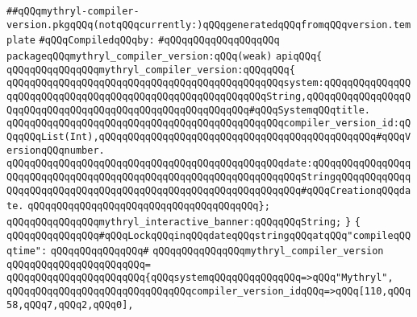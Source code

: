 \label{src/lib/core/internal/mythryl-compiler-version.pkg}
\verb|##qQQqmythryl-compiler-version.pkgqQQq(notqQQqcurrently:)qQQqgeneratedqQQqfromqQQqversion.template|\newline
\newline
\verb|#qQQqCompiledqQQqby:|\newline
\verb|#qQQqqQQqqQQqqQQqqQQq|\newline
\newline
\verb|packageqQQqmythryl_compiler_version:qQQq(weak)|\newline
\verb|apiqQQq{|\newline
\newline
\verb|qQQqqQQqqQQqqQQqmythryl_compiler_version:qQQqqQQq{|\newline
\verb|qQQqqQQqqQQqqQQqqQQqqQQqqQQqqQQqqQQqqQQqqQQqqQQqsystem:qQQqqQQqqQQqqQQqqQQqqQQqqQQqqQQqqQQqqQQqqQQqqQQqqQQqqQQqqQQqString,qQQqqQQqqQQqqQQqqQQqqQQqqQQqqQQqqQQqqQQqqQQqqQQqqQQqqQQqqQQq#qQQqSystemqQQqtitle.|\newline
\verb|qQQqqQQqqQQqqQQqqQQqqQQqqQQqqQQqqQQqqQQqqQQqqQQqcompiler_version_id:qQQqqQQqList(Int),qQQqqQQqqQQqqQQqqQQqqQQqqQQqqQQqqQQqqQQqqQQqqQQq#qQQqVersionqQQqnumber.|\newline
\verb|qQQqqQQqqQQqqQQqqQQqqQQqqQQqqQQqqQQqqQQqqQQqqQQqdate:qQQqqQQqqQQqqQQqqQQqqQQqqQQqqQQqqQQqqQQqqQQqqQQqqQQqqQQqqQQqqQQqqQQqStringqQQqqQQqqQQqqQQqqQQqqQQqqQQqqQQqqQQqqQQqqQQqqQQqqQQqqQQqqQQqqQQq#qQQqCreationqQQqdate.|\newline
\verb|qQQqqQQqqQQqqQQqqQQqqQQqqQQqqQQqqQQqqQQq};|\newline
\newline
\verb|qQQqqQQqqQQqqQQqmythryl_interactive_banner:qQQqqQQqString;|\newline
\newline
\verb|}|\newline
\verb|{|\newline
\verb|qQQqqQQqqQQqqQQq#qQQqLockqQQqinqQQqdateqQQqstringqQQqatqQQq"compileqQQqtime":|\newline
\verb|qQQqqQQqqQQqqQQq#|\newline
\verb|qQQqqQQqqQQqqQQqmythryl_compiler_version|\newline
\verb|qQQqqQQqqQQqqQQqqQQqqQQq=|\newline
\verb|qQQqqQQqqQQqqQQqqQQqqQQq{qQQqsystemqQQqqQQqqQQqqQQq=>qQQq"Mythryl",|\newline
\verb|qQQqqQQqqQQqqQQqqQQqqQQqqQQqqQQqcompiler_version_idqQQq=>qQQq[110,qQQq58,qQQq7,qQQq2,qQQq0],|\newline
